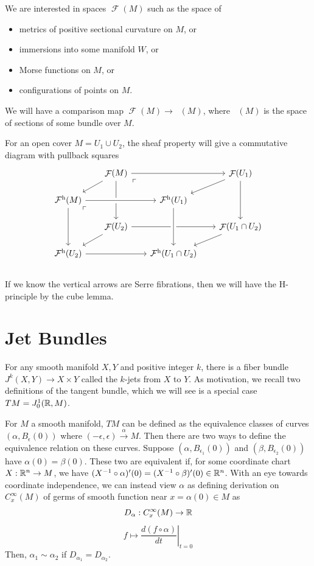 \documentclass{article}
\newtheorem{proposed work}[theorem]{Proposed Work}
\DeclareMathOperator{\CF}{\mathcal F}
\DeclareMathOperator{\CFh}{\mathcal{F}^{h}} %
\begin{document}
We are interested in spaces $\CF(M)$ such as the space of
\begin{itemize}
  \item metrics of positive sectional curvature on $M$, or
  \item immersions into some manifold $W$, or
  \item Morse functions on $M$, or 
  \item configurations of points on $M$.
\end{itemize}
We will have a comparison map $\CF(M) \to \CFh(M)$, where $\CFh(M)$ is
the space of sections of some bundle over $M$.

For an open cover $M = U_1 \cup U_2$, the sheaf property will give a
commutative diagram with pullback squares
  \[
    \begin{tikzcd}[row sep=scriptsize, column sep=scriptsize]
      & \CF(M) \arrow[dl] \arrow[rr] \arrow[dd] \arrow[dr,
      phantom, "\ulcorner", very near start] & & \CF(U_1) \arrow[dl]
      \arrow[dd] \\
      \CFh(M) \arrow[rr, crossing over] \arrow[dd] \arrow[dr,
      phantom, "\ulcorner", very near start] & & \CFh(U_1) \\
      & \CF(U_2) \arrow[dl] \arrow[rr] & & \CF(U_1\cap U_2) \arrow[dl] \\
      \CFh(U_2) \arrow[rr] & & \CFh(U_1\cap U_2) \arrow[from=uu, crossing over]\\
    \end{tikzcd}
  \]
  If we know the vertical arrows are Serre fibrations, then we will
  have the H-principle by the cube lemma.
  
\section{Jet Bundles}

For any smooth manifold $X,Y$ and positive integer $k$, there is a fiber bundle $J^k(X,Y)\to X\times Y$ called the $k$-jets from $X$ to $Y$. As motivation, we recall two definitions of the tangent bundle, which we will see is a special case $TM=J^1_0(\mathbb R, M)$.

For $M$ a smooth manifold, $TM$ can be defined as the equivalence classes of curves $(\alpha, B_{\epsilon}(0))$ where $(-\epsilon, \epsilon) \xrightarrow{\alpha} M$. Then there are two ways to define the equivalence relation on these curves. Suppose $(\alpha, B_{\epsilon_1}(0))$ and $(\beta, B_{\epsilon_2}(0))$ have $\alpha(0)=\beta(0)$. These two are equivalent if, for some coordinate chart $X: \mathbb R^n\to M$, we have $(X^{-1}\circ \alpha)'(0) = (X^{-1}\circ \beta)'(0) \in \mathbb R^n$. With an eye towards coordinate independence, we can instead view $\alpha$ as defining derivation on $C^\infty_x(M)$ of germs of smooth function near $x=\alpha(0)\in M$ as
\[
  D_\alpha: C^\infty_x(M) \to \mathbb R
\]
\[
  f \mapsto \left.\frac{d(f\circ\alpha)}{dt}\right|_{t=0}
\]
Then, $\alpha_1\sim \alpha_2$ if $D_{\alpha_1}=D_{\alpha_2}$.
\end{document}
